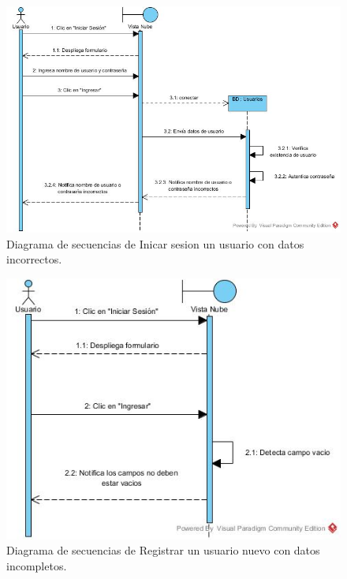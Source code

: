 \begin{figure}[htbp!]
		\centering
			\includegraphics[width=1\textwidth]{images/Iniciar_trayectoria_a}
		\caption{Diagrama de secuencias de Inicar sesion un usuario con datos incorrectos.}
\end{figure}

\begin{figure}[htbp!]
		\centering
			\includegraphics[width=1\textwidth]{images/Iniciar_trayectoria_b}
		\caption{Diagrama de secuencias de Registrar un usuario nuevo con datos incompletos.}
\end{figure}

